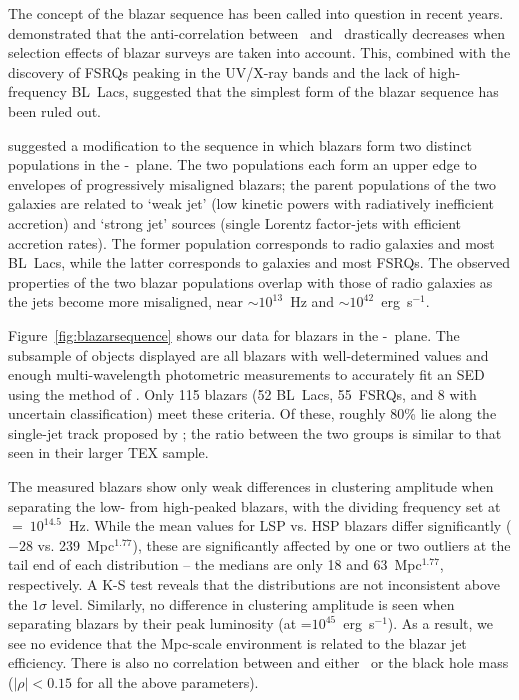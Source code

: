 \documentclass{emulateapj}
\begin{document}
The concept of the blazar sequence has been called into question in recent years. \citet{pad07} demonstrated that the anti-correlation between \lpeak~and \nupeak~drastically decreases when selection effects of blazar surveys are taken into account. This, combined with the discovery of FSRQs peaking in the UV/X-ray bands \citep{pad03,lan08a} and the lack of high-frequency BL~Lacs, suggested that the simplest form of the blazar sequence has been ruled out. 

\citet{mey11} suggested a modification to the sequence in which blazars form two distinct populations in the \nupeak-\lpeak~plane. The two populations each form an upper edge to envelopes of progressively misaligned blazars; the parent populations of the two galaxies are related to `weak jet' (low kinetic powers with radiatively inefficient accretion) and `strong jet' sources (single Lorentz factor-jets with efficient accretion rates). The former population corresponds to \FRI{} radio galaxies and most BL~Lacs, while the latter corresponds to \FRII{} galaxies and most FSRQs. The observed properties of the two blazar populations overlap with those of radio galaxies as the jets become more misaligned, near \nupeak$\sim10^{13}$~Hz and \lpeak$\sim10^{42}$~erg~s$^{-1}$. 

Figure~\ref{fig:blazarsequence} shows our data for blazars in the \nupeak-\lpeak~plane. The subsample of objects displayed are all blazars with well-determined \bgb{} values and enough multi-wavelength photometric measurements to accurately fit an SED using the method of \citet{mey11}. Only 115 blazars (52 BL~Lacs, 55~FSRQs, and 8 with uncertain classification) meet these criteria. Of these, roughly 80\% lie along the single-jet track proposed by \citet{mey11}; the ratio between the two groups is similar to that seen in their larger TEX sample. 

The measured blazars show only weak differences in clustering amplitude when separating the low- from high-peaked blazars, with the dividing frequency set at \nupeak~$=~10^{14.5}$~Hz. While the mean \bgb{} values for LSP vs. HSP blazars differ significantly ($-28$ vs. 239~Mpc$^{1.77}$), these are significantly affected by one or two outliers at the tail end of each distribution -- the medians are only 18 and 63~Mpc$^{1.77}$, respectively. A K-S test reveals that the \bgb{} distributions are not inconsistent above the $1\sigma$ level. Similarly, no difference in clustering amplitude is seen when separating blazars by their peak luminosity (at \lpeak=$10^{45}$~erg~s$^{-1}$). As a result, we see no evidence that the Mpc-scale environment is related to the blazar jet efficiency. There is also no correlation between \bgb{} and either \lext~or the black hole mass ($|\rho|<0.15$ for all the above parameters). 
\end{document}
